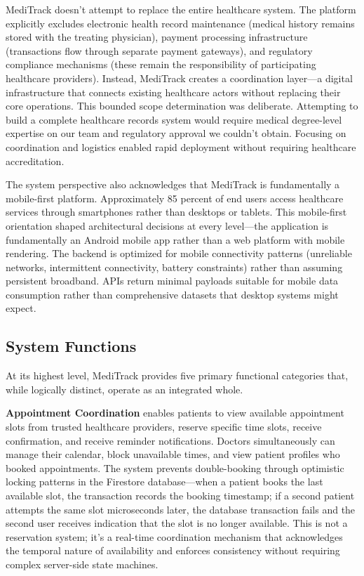 \documentclass[12pt,a4paper]{report}
\begin{document}
MediTrack doesn't attempt to replace the entire healthcare system. The platform explicitly excludes electronic health record maintenance (medical history remains stored with the treating physician), payment processing infrastructure (transactions flow through separate payment gateways), and regulatory compliance mechanisms (these remain the responsibility of participating healthcare providers). Instead, MediTrack creates a coordination layer—a digital infrastructure that connects existing healthcare actors without replacing their core operations. This bounded scope determination was deliberate. Attempting to build a complete healthcare records system would require medical degree-level expertise on our team and regulatory approval we couldn't obtain. Focusing on coordination and logistics enabled rapid deployment without requiring healthcare accreditation.

The system perspective also acknowledges that MediTrack is fundamentally a mobile-first platform. Approximately 85 percent of end users access healthcare services through smartphones rather than desktops or tablets. This mobile-first orientation shaped architectural decisions at every level—the application is fundamentally an Android mobile app rather than a web platform with mobile rendering. The backend is optimized for mobile connectivity patterns (unreliable networks, intermittent connectivity, battery constraints) rather than assuming persistent broadband. APIs return minimal payloads suitable for mobile data consumption rather than comprehensive datasets that desktop systems might expect.

\subsection{System Functions}

At its highest level, MediTrack provides five primary functional categories that, while logically distinct, operate as an integrated whole.

\textbf{Appointment Coordination} enables patients to view available appointment slots from trusted healthcare providers, reserve specific time slots, receive confirmation, and receive reminder notifications. Doctors simultaneously can manage their calendar, block unavailable times, and view patient profiles who booked appointments. The system prevents double-booking through optimistic locking patterns in the Firestore database—when a patient books the last available slot, the transaction records the booking timestamp; if a second patient attempts the same slot microseconds later, the database transaction fails and the second user receives indication that the slot is no longer available. This is not a reservation system; it's a real-time coordination mechanism that acknowledges the temporal nature of availability and enforces consistency without requiring complex server-side state machines.
\end{document}
